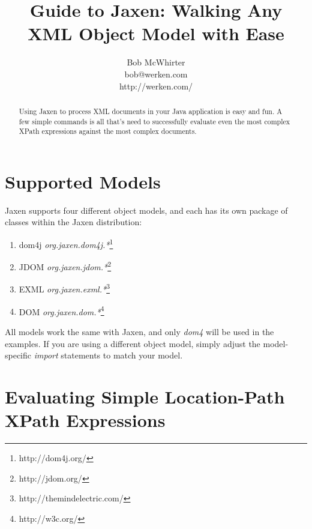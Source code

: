 \documentclass[10pt,twocolumn,letterpaper]{article}
\begin{document}
\let\footnoterule\hrule
\setlength{\skip\footins}{10pt plus 5pt minus 3pt}

\makeatletter

\renewcommand{\@makefntext}[1]%
	{\noindent\makebox[1.8em][r]{\@makefnmark}#1}

\makeatother

\title{Guide to Jaxen: Walking Any XML Object Model with Ease}

\author{Bob McWhirter\\bob@werken.com\\http://werken.com/}
\maketitle


\begin{abstract}
Using Jaxen to process XML documents in your Java application
is easy and fun.  A few simple commands is all that's need 
to successfully evaluate even the most complex XPath expressions
against the most complex documents.
\end{abstract}

\section{Supported Models}

Jaxen supports four different object models, and each has
its own package of classes within the Jaxen distribution:

\begin{enumerate}
	\item{dom4j} 
		\emph{org.jaxen.dom4j.*}\footnote{http://dom4j.org/}
	\item{JDOM}  
		\emph{org.jaxen.jdom.*}\footnote{http://jdom.org/}
	\item{EXML} 
		\emph{org.jaxen.exml.*}\footnote{http://themindelectric.com/}
	\item{DOM}   
		\emph{org.jaxen.dom.*}\footnote{http://w3c.org/}
\end{enumerate}

All models work the same with Jaxen, and only \emph{dom4} will
be used in the examples.  If you are using a different object
model, simply adjust the model-specific \emph{import} statements
to match your model.

\section{Evaluating Simple Location-Path XPath Expressions}
\end{document}
